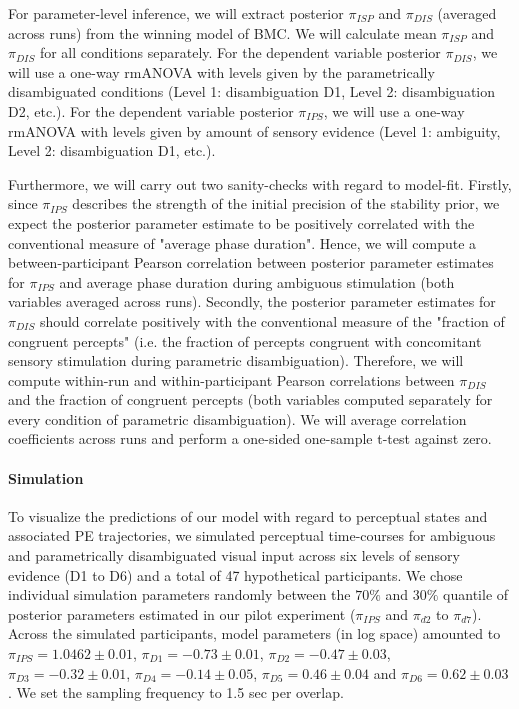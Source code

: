 \documentclass[12pt]{article}
\begin{document}
For parameter-level inference, we will extract posterior $\pi_{ISP}$ and $\pi_{DIS}$ (averaged across runs) from the winning model of BMC. We will calculate mean $\pi_{ISP}$ and $\pi_{DIS}$ for all conditions separately. For the dependent variable posterior $\pi_{DIS}$, we will use a one-way rmANOVA with levels given by the parametrically disambiguated conditions (Level 1: disambiguation D1, Level 2: disambiguation D2, etc.). For the dependent variable posterior $\pi_{IPS}$, we will use a one-way rmANOVA with levels given by amount of sensory evidence (Level 1: ambiguity, Level 2: disambiguation D1, etc.).

Furthermore, we will carry out two sanity-checks with regard to model-fit. Firstly, since $\pi_{IPS}$ describes the strength of the initial precision of the stability prior, we expect the posterior parameter estimate to be positively correlated with the conventional measure of "average phase duration". Hence, we will compute a between-participant Pearson correlation between posterior parameter estimates for $\pi_{IPS}$ and average phase duration during ambiguous stimulation (both variables averaged across runs). Secondly, the posterior parameter estimates for $\pi_{DIS}$ should correlate positively with the conventional measure of the "fraction of congruent percepts" (i.e. the fraction of percepts congruent with concomitant sensory stimulation during parametric disambiguation). Therefore, we will compute within-run and within-participant Pearson correlations between $\pi_{DIS}$ and the fraction of congruent percepts (both variables computed separately for every condition of parametric disambiguation). We will average correlation coefficients across runs and perform a one-sided one-sample t-test against zero. 

\paragraph{Simulation}

To visualize the predictions of our model with regard to perceptual states and associated PE trajectories, we simulated perceptual time-courses for ambiguous and parametrically disambiguated visual input across six levels of sensory evidence (D1 to D6) and a total of 47 hypothetical participants. We chose individual simulation parameters randomly between the $70\%$ and $30\%$ quantile of posterior parameters estimated in our pilot experiment ($\pi_{IPS}$ and $\pi_{d2}$ to $\pi_{d7}$). Across the simulated participants, model parameters (in log space) amounted to $\pi_{IPS} = 1.0462 \pm 0.01$, $\pi_{D1} = -0.73 \pm 0.01$, $\pi_ {D2} = -0.47 \pm 0.03$, $\pi_ {D3} = -0.32 \pm 0.01$, $\pi_ {D4} = -0.14 \pm 0.05$, $\pi_ {D5} = 0.46 \pm 0.04$ and $\pi_ {D6} = 0.62 \pm 0.03$. We set the sampling frequency to 1.5 sec per overlap. 
\end{document}
